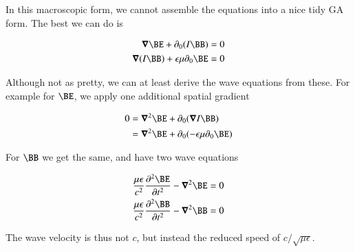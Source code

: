 In this macroscopic form, we cannot assemble the equations into a nice tidy GA form.  The best we can do is

\begin{align}
\spacegrad \BE + \partial_0 (I\BB) &= 0 \\
\spacegrad (I \BB) + \epsilon \mu \partial_0 \BE &= 0 
\end{align}

Although not as pretty, we can at least derive the wave equations from these.  For example for $\BE$, we apply one additional spatial gradient

\begin{align*}
0 
&= \spacegrad^2 \BE + \partial_0 (\spacegrad I \BB) \\
&= \spacegrad^2 \BE + \partial_0 ( -\epsilon \mu \partial_0 \BE ) \\
\end{align*}

For $\BB$ we get the same, and have two wave equations

\begin{align}
\frac{\mu \epsilon}{c^2} \frac{\partial^2 \BE}{\partial t^2} - \spacegrad^2 \BE &= 0 \\
\frac{\mu \epsilon}{c^2} \frac{\partial^2 \BB}{\partial t^2} - \spacegrad^2 \BB &= 0
\end{align}

The wave velocity is thus not $c$, but instead the reduced speed of $c/{\sqrt{\mu\epsilon}}$.

%
%

%
